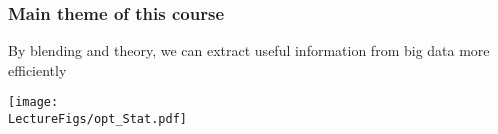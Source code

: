 \documentclass[compress,
mathserif,wide,%
]{beamer}
\begin{document}








\begin{frame}
  \frametitle{Main theme of this course}

  By blending  and  theory, we can extract useful information from big data more efficiently
\vfill
  \begin{center}
    \texttt{[image: \\LectureFigs/opt\_Stat.pdf]}
\end{center}


\end{frame}
\end{document}

